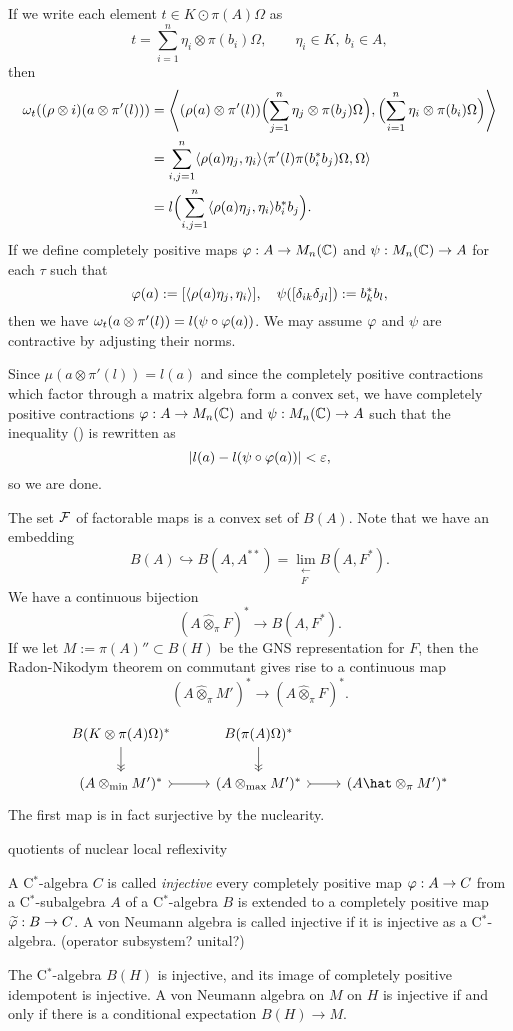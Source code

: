 \documentclass{../../large}
\begin{document}
\begin{pf}
If we write each element $t\in K\odot\pi(A)\Omega$ as
\[t=\sum_{i=1}^n\eta_i\otimes\pi(b_i)\Omega,\qquad\eta_i\in K,\ b_i\in A,\]
then
\begin{align*}
\omega_t((\rho\otimes i)(a\otimes\pi'(l)))
&=\left\langle(\rho(a)\otimes\pi'(l))\Bigl(\sum_{j=1}^n\eta_j\otimes\pi(b_j)\Omega\Bigr),\Bigl(\sum_{i=1}^n\eta_i\otimes\pi(b_i)\Omega\Bigr)\right\rangle\\
&=\sum_{i,j=1}^n\langle\rho(a)\eta_j,\eta_i\rangle\langle\pi'(l)\pi(b_i^*b_j)\Omega,\Omega\rangle\\
&=l\Bigl(\sum_{i,j=1}^n\langle\rho(a)\eta_j,\eta_i\rangle b_i^*b_j\Bigr).
\end{align*}
If we define completely positive maps $\varphi:A\to M_n(\mathbb{C})$ and $\psi:M_n(\mathbb{C})\to A$ for each $\tau$ such that
\[\varphi(a):=[\langle\rho(a)\eta_j,\eta_i\rangle],\quad\psi([\delta_{ik}\delta_{jl}]):=b_k^*b_l,\]
then we have $\omega_t(a\otimes\pi'(l))=l(\psi\circ\varphi(a))$.
We may assume $\varphi$ and $\psi$ are contractive by adjusting their norms.

Since $\mu(a\otimes\pi'(l))=l(a)$ and since the completely positive contractions which factor through a matrix algebra form a convex set, we have completely positive contractions $\varphi:A\to M_n(\mathbb{C})$ and $\psi:M_n(\mathbb{C})\to A$ such that the inequality (\dagger) is rewritten as
\[|l(a)-l(\psi\circ\varphi(a))|<\varepsilon,\]
so we are done.
\end{pf}

The set $\mathcal{F}$ of factorable maps is a convex set of $B(A)$.
Note that we have an embedding
\[B(A)\hookrightarrow B(A,A^{**})=\lim_{\substack{\longleftarrow\\F}}B(A,F^*).\]
We have a continuous bijection
\[(A\hat\otimes_\pi F)^*\to B(A,F^*).\]
If we let $M:=\pi(A)''\subset B(H)$ be the GNS representation for $F$, then the Radon-Nikodym theorem on commutant gives rise to a continuous map
\[(A\hat\otimes_\pi M')^*\to(A\hat\otimes_\pi F)^*.\]

\[\begin{tikzcd}
B(K\otimes\pi(A)\Omega)^* \dar[->>] & B(\pi(A)\Omega)^* \dar[->>] &\\
(A\otimes_{\min}M')^*\rar[>->]
&(A\otimes_{\max}M')^*\rar[>->]
&(A\hat\otimes_\pi M')^*
\end{tikzcd}\]
The first map is in fact surjective by the nuclearity.





quotients of nuclear
local reflexivity



\begin{prb}
A C$^*$-algebra $C$ is called \emph{injective} every completely positive map $\varphi:A\to C$ from a C$^*$-subalgebra $A$ of a C$^*$-algebra $B$ is extended to a completely positive map $\widetilde{\varphi}:B\to C$.
A von Neumann algebra is called injective if it is injective as a C$^*$-algebra.
(operator subsystem? unital?)

The C$^*$-algebra $B(H)$ is injective, and its image of completely positive idempotent is injective.
A von Neumann algebra on $M$ on $H$ is injective if and only if there is a conditional expectation $B(H)\to M$.

\end{prb}
\end{document}

